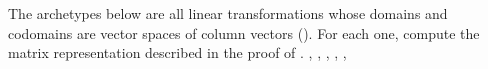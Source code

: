 The archetypes below are all linear transformations whose domains and codomains are vector spaces of column vectors ().  For each one, compute the matrix representation described in the proof of .\newline\newline
{},
,
,
,
,
